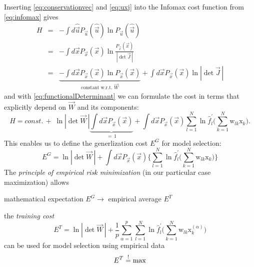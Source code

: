 \clearpage

Inserting \eqref{eq:conservationvec} and \eqref{eq:uxj} into the Infomax cost function from \eqref{eq:infomax} gives 
\begin{eqnarray}
H & = & -\int d \widehat{\vec{u}} P_{\vec{u}} (\widehat{\vec{u}})
  \ln P_{\vec{u}} (\widehat{\vec{u}}) \\
& = &  
-\int d \vec{x} P_{\vec{x}} (\vec{x}) \ln \frac{P_{\vec{x}}(\vec{x})}{|\det \vec{J}\,|} \\
& = & 
\underbrace{
    -\int d \vec{x} P_{\vec{x}} (\vec{x}) \ln P_{\vec{x}}(\vec{x})
}_{ \text{constant w.r.t. } \vec W } 
    + \int d \vec{x} P_{\vec{x}} (\vec{x}) \ln |\det \vec{J}\,|
\end{eqnarray}
and with \eqref{eq:functionalDeterminant} we can formulate the cost 
in terms that explicitly depend on $\vec W$ and its components:
\begin{equation}
	H = const. \, + \; \ln |\det \vec{W}\,| \underbrace{\int d \vec{x} P_{\vec{x}} (\vec{x})}_{=\,1}
		+ \int d \vec{x} P_{\vec{x}} (\vec{x}) \sum\limits_{l = 1}^N
			\ln \widehat{f}_l^{'} \Bigg( \sum\limits_{k = 1}^N 
			\mathrm{w}_{lk} \mathrm{x}_k \Bigg).
\end{equation}
This enables us to define the generlization cost $E^G$ for model selection:
\begin{equation} \tag{generalization cost}
	E^G = \ln |\det \vec W\,| + \int d \vec{x} P_{\vec{x}} (\vec{x})
		\Bigg\{ \sum\limits_{l = 1}^N \ln
			\widehat{f}_l^{'} \Bigg( \sum\limits_{k = 1}^N 
			\mathrm{w}_{lk} \mathrm{x}_k \Bigg)
		\Bigg\}
\end{equation}
The \emph{principle of empirical risk minimization} (in our particular case maximization) allows
\begin{center}
mathematical expectation $E^G \longrightarrow$ empirical average $E^T$
\end{center}
the \emph{training cost}
\begin{equation} \label{eq:trainingCost}
	E^T = \ln |\det \vec{W}\,| + \frac{1}{p} \sum\limits_{\alpha = 1}^p
		\sum\limits_{l = 1}^N \ln \widehat{f}_l^{'} \Bigg( 
		\sum\limits_{k = 1}^N \mathrm{w}_{lk} 
		\mathrm{x}_k^{(\alpha)} \Bigg)
\end{equation}
can be used for model selection using empirical data 
\begin{equation}
E^T \stackrel{\mathrm{!}}{=} \max
\end{equation}

\newpage

